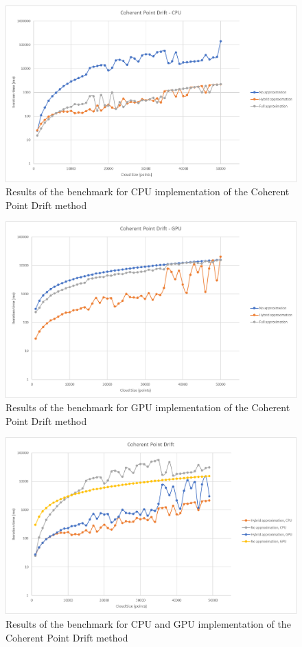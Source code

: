 \documentclass[titlepage]{article}
\begin{document}
\begin{figure}[H]
\includegraphics[width=\textwidth]{ms-cpd-1.png}
\caption{Results of the benchmark for CPU implementation of the Coherent Point Drift method}
\end{figure}

\begin{figure}[H]
\includegraphics[width=\textwidth]{ms-cpd-2.png}
\caption{Results of the benchmark for GPU implementation of the Coherent Point Drift method}
\end{figure}

\begin{figure}[H]
\includegraphics[width=\textwidth]{ms-cpd-3.png}
\caption{Results of the benchmark for CPU and GPU implementation of the Coherent Point Drift method}
\end{figure}
\end{document}
